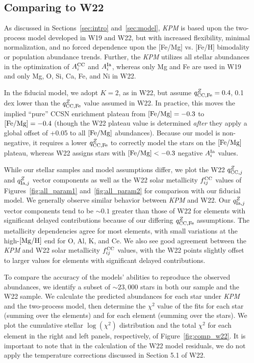 \documentclass[modern]{aastex631}
\newcommand{\femg}{[{\rm Fe}/{\rm Mg}]}
\newcommand{\mgh}{[{\rm Mg}/{\rm H}]}
\newcommand{\qcc}{q_{{\rm CC,}j}^{Z}}
\newcommand{\qccFe}{q_{{\rm CC, Fe}}^{Z}}
\newcommand{\qIa}{q_{{\rm Ia,}j}^{Z}}
\newcommand{\Acc}{A^{\rm CC}_{i}}
\newcommand{\AIa}{A^{\rm Ia}_{i}}
\newcommand{\fcc}{f_{ij}^{\rm CC}}
\newcommand{\name}{\textsl{KPM}}
\begin{document}
\subsection{Comparing to W22}\label{subsec:w22}

As discussed in Sections~\ref{sec:intro} and~\ref{sec:model}, \name{} is based upon the two-process model developed in W19 and W22, but with increased flexibility, minimal normalization, and no forced dependence upon the [Fe/Mg] vs. [Fe/H] bimodality or population abundance trends. Further, the \name{} utilizes all stellar abundances in the optimization of $\Acc$ and $\AIa$, whereas only Mg and Fe are used in W19 and only Mg, O, Si, Ca, Fe, and Ni in W22. 

In the fiducial model, we adopt $K=2$, as in W22, but assume $\qccFe = 0.4$, 0.1 dex lower than the $\qccFe$ value assumed in W22. In practice, this moves the implied ``pure'' CCSN enrichment plateau from $\femg=-0.3$ to $\femg=-0.4$ (though the W22 plateau value is determined \textit{after} they apply a global offset of +0.05 to all $\femg$ abundances). Because our model is non-negative, it requires a lower $\qccFe$ to correctly model the stars on the $\femg$ plateau, whereas W22 assigns stars with $\femg < -0.3$ negative $\AIa$ values.

While our stellar samples and model assumptions differ, we plot the W22 $\qcc$ and $\qIa$ vector components as well as the W22 solar metallicity $\fcc$ values of Figures~\ref{fig:all_param1} and~\ref{fig:all_param2} for comparison with our fiducial model. We generally observe similar behavior between \name{} and W22. Our $\qIa$ vector components tend to be $\sim 0.1$ greater than those of W22 for elements with significant delayed contributions because of our differing $\qccFe$ assumptions. The metallicity dependencies agree for most elements, with small variations at the high-$\mgh$ end for O, Al, K, and Ce. We also see good agreement between the \name{} and W22 solar metallicity $\fcc$ values, with the W22 points slightly offset to larger values for elements with significant delayed contributions.

To compare the accuracy of the models' abilities to reproduce the observed abundances, we identify a subset of $\sim 23,000$ stars in both our sample and the W22 sample. We calculate the predicted abundances for each star under \name{} and the two-process model, then determine the $\chi^2$ value of the fits for each star (summing over the elements) and for each element (summing over the stars). We plot the cumulative stellar $\log(\chi^2)$ distribution and the total $\chi^2$ for each element in the right and left panels, respectively, of Figure~\ref{fig:comp_w22}. It is important to note that in the calculation of the W22 model residuals, we do not apply the temperature corrections discussed in Section 5.1 of W22. 
\end{document}
